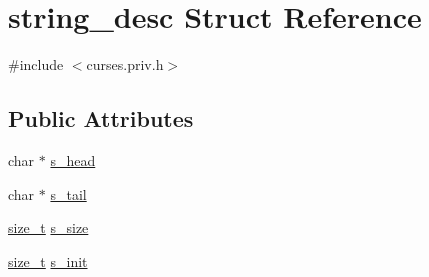 \hypertarget{structstring__desc}{\section{string\-\_\-desc Struct Reference}
\label{structstring__desc}
}


{\ttfamily \#include $<$curses.\-priv.\-h$>$}

\subsection*{Public Attributes}
\begin{DoxyCompactItemize}
\item 
char $\ast$ \hyperlink{structstring__desc_ae5413d01e222488497e35618d94cfef0}{s\-\_\-head}
\item 
char $\ast$ \hyperlink{structstring__desc_a97d51c0f0a7e1d7cd85e639b46f977af}{s\-\_\-tail}
\item 
\hyperlink{nc__alloc_8h_a7b60c5629e55e8ec87a4547dd4abced4}{size\-\_\-t} \hyperlink{structstring__desc_adaa2effe32b0daaee4055a5db33190d0}{s\-\_\-size}
\item 
\hyperlink{nc__alloc_8h_a7b60c5629e55e8ec87a4547dd4abced4}{size\-\_\-t} \hyperlink{structstring__desc_aa8af30bec0502dd85e6fd55af630aa96}{s\-\_\-init}
\end{DoxyCompactItemize}


